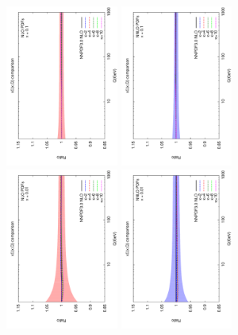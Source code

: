 \documentclass[letter,11pt]{article}
\begin{document}
%
%
\begin{figure}[h]
\centering
\includegraphics[width=0.33\textwidth,angle=-90]{./singlet_ratio_kb_nlo_x_01.pdf}
\includegraphics[width=0.33\textwidth,angle=-90]{./singlet_ratio_kb_nnlo_x_01.pdf}
\includegraphics[width=0.33\textwidth,angle=-90]{./singlet_ratio_kb_nlo_x_001.pdf}
\includegraphics[width=0.33\textwidth,angle=-90]{./singlet_ratio_kb_nnlo_x_001.pdf}

\end{figure}
\end{document}
